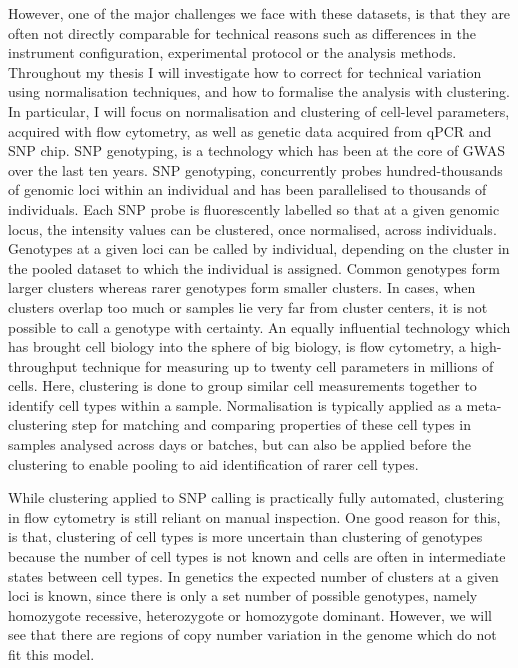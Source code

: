 However, one of the major challenges we face with these datasets, is that they are often not directly comparable for
technical reasons such as differences in the instrument configuration, experimental protocol or the analysis methods.
Throughout my thesis I will investigate how to correct for technical variation using normalisation techniques, 
and how to formalise the analysis with clustering.
In particular, I will focus on normalisation and clustering of cell-level parameters, acquired with flow cytometry,
as well as genetic data acquired from \gls{qPCR} and \gls{SNP} chip.  
\gls{SNP} genotyping, is a technology which has been at the core of \gls{GWAS} over the last ten years.
SNP genotyping, concurrently probes hundred-thousands of genomic loci within an individual and
has been parallelised to thousands of individuals.
Each SNP probe is fluorescently labelled so that at a given genomic locus, the intensity values can be clustered,
once normalised, across individuals.
Genotypes at a given loci can be called by individual, depending on the cluster in the pooled dataset to which the individual is assigned.
Common genotypes form larger clusters whereas rarer genotypes form smaller clusters.
In cases, when clusters overlap too much or samples lie very far from cluster centers, it is not possible to call a genotype with certainty.
An equally influential technology which has brought cell biology into the sphere of big biology, is flow cytometry,
a high-throughput technique for measuring up to twenty cell parameters in millions of cells.
Here, clustering is done to group similar cell measurements together to identify cell types within a sample.
Normalisation is typically applied as a meta-clustering step for matching and comparing properties of these cell types in samples analysed across days or batches,
but can also be applied before the clustering to enable pooling to aid identification of rarer cell types.

While clustering applied to SNP calling is practically fully automated,
clustering in flow cytometry is still reliant on manual inspection.
One good reason for this, is that,
clustering of cell types is more uncertain than clustering of genotypes because the number of cell types is not known and
cells are often in intermediate states between cell types.
In genetics the expected number of clusters at a given loci is known,
since there is only a set number of possible genotypes, namely homozygote recessive,
heterozygote or homozygote dominant.
However, we will see that there are regions of copy number variation in the genome
which do not fit this model.

